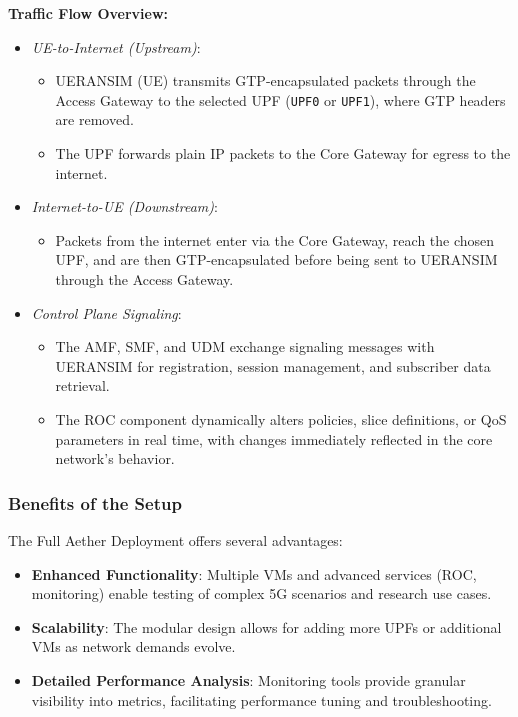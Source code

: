 \textbf{Traffic Flow Overview:}
\begin{itemize}
    \item \emph{UE-to-Internet (Upstream)}:
    \begin{itemize}
        \item UERANSIM (UE) transmits GTP-encapsulated packets through the Access Gateway to the selected UPF (\texttt{UPF0} or \texttt{UPF1}), where GTP headers are removed.
        \item The UPF forwards plain IP packets to the Core Gateway for egress to the internet.
    \end{itemize}
    \item \emph{Internet-to-UE (Downstream)}:
    \begin{itemize}
        \item Packets from the internet enter via the Core Gateway, reach the chosen UPF, and are then GTP-encapsulated before being sent to UERANSIM through the Access Gateway.
    \end{itemize}
    \item \emph{Control Plane Signaling}:
    \begin{itemize}
        \item The AMF, SMF, and UDM exchange signaling messages with UERANSIM for registration, session management, and subscriber data retrieval.
        \item The ROC component dynamically alters policies, slice definitions, or QoS parameters in real time, with changes immediately reflected in the core network’s behavior.
    \end{itemize}
\end{itemize}

\subsubsection{Benefits of the Setup}
\label{subsubsec:labpc-benefits}

The Full Aether Deployment offers several advantages:
\begin{itemize}
    \item \textbf{Enhanced Functionality}: Multiple VMs and advanced services (ROC, monitoring) enable testing of complex 5G scenarios and research use cases.
    \item \textbf{Scalability}: The modular design allows for adding more UPFs or additional VMs as network demands evolve.
    \item \textbf{Detailed Performance Analysis}: Monitoring tools provide granular visibility into metrics, facilitating performance tuning and troubleshooting.
\end{itemize}

